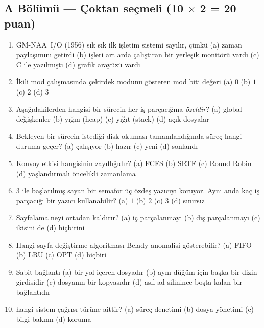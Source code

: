 \subsection*{A Bölümü --- Çoktan seçmeli \hfill (10 $\times$ 2 = 20 puan)}
\begin{enumerate}[leftmargin=2.0em,label=A\arabic*.,itemsep=0.3em]
  \item GM-NAA~I/O (1956) sık sık ilk işletim sistemi sayılır, çünkü \quad (a) zaman paylaşımını getirdi \quad (b) işleri art arda çalıştıran bir yerleşik monitörü vardı \quad (c) C ile yazılmıştı \quad (d) grafik arayüzü vardı
  \item İkili mod çalışmasında çekirdek modunu gösteren mod biti değeri \quad (a) $0$ \quad (b) $1$ \quad (c) $2$ \quad (d) $3$
  \item Aşağıdakilerden hangisi bir sürecin her iş parçacığına \emph{özeldir}? \quad (a) global değişkenler \quad (b) yığın (heap) \quad (c) yığıt (stack) \quad (d) açık dosyalar
  \item Bekleyen bir sürecin istediği disk okuması tamamlandığında süreç hangi duruma geçer? \quad (a) çalışıyor \quad (b) hazır \quad (c) yeni \quad (d) sonlandı
  \item Konvoy etkisi hangisinin zayıflığıdır? \quad (a) FCFS \quad (b) SRTF \quad (c) Round Robin \quad (d) yaşlandırmalı öncelikli zamanlama
  \item $3$ ile başlatılmış sayan bir semafor üç özdeş yazıcıyı koruyor. Aynı anda kaç iş parçacığı bir yazıcı kullanabilir? \quad (a) $1$ \quad (b) $2$ \quad (c) $3$ \quad (d) sınırsız
  \item Sayfalama neyi ortadan kaldırır? \quad (a) iç parçalanmayı \quad (b) dış parçalanmayı \quad (c) ikisini de \quad (d) hiçbirini
  \item Hangi sayfa değiştirme algoritması Belady anomalisi gösterebilir? \quad (a) FIFO \quad (b) LRU \quad (c) OPT \quad (d) hiçbiri
  \item Sabit bağlantı \quad (a) bir yol içeren dosyadır \quad (b) aynı düğüm için başka bir dizin girdisidir \quad (c) dosyanın bir kopyasıdır \quad (d) asıl ad silinince boşta kalan bir bağlantıdır
  \item {} hangi sistem çağrısı türüne aittir? \quad (a) süreç denetimi \quad (b) dosya yönetimi \quad (c) bilgi bakımı \quad (d) koruma
\end{enumerate}

